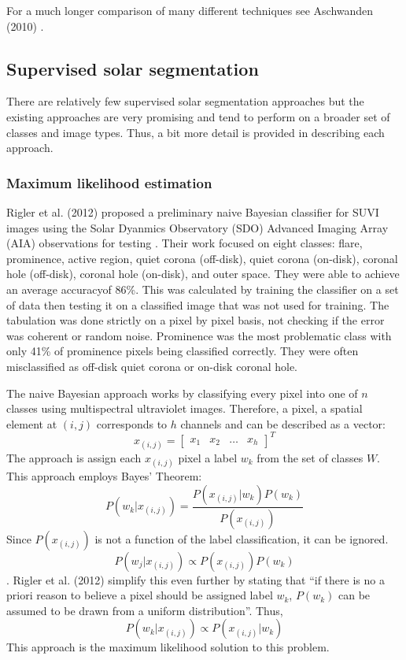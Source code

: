 \documentclass[twoside]{report}
\begin{document}
For a much longer comparison of many different techniques see Aschwanden (2010) \cite{aschwanden:2010}. 

\subsection{Supervised solar segmentation} \label{sec:supervised}
There are relatively few supervised solar segmentation approaches but the existing approaches are very promising and tend to perform on a broader set of classes and image types. Thus, a bit more detail is provided in describing each approach. 

\subsubsection{Maximum likelihood estimation}\label{sec:riglermaxlikelihood}

Rigler et al. (2012) proposed a preliminary naive Bayesian classifier for SUVI images using the Solar Dyanmics Observatory (SDO) Advanced Imaging Array (AIA) observations for testing \cite{rigler:2012}. Their work focused on eight classes: flare, prominence, active region, quiet corona (off-disk), quiet corona (on-disk), coronal hole (off-disk), coronal hole (on-disk), and outer space. They were able to achieve an average accuracyof 86\%. This was calculated by training the classifier on a set of data then testing it on a classified image that was not used for training. The tabulation was done strictly on a pixel by pixel basis, not checking if the error was coherent or random noise. Prominence was the most problematic class with only 41\% of prominence pixels being classified correctly. They were often misclassified as off-disk quiet corona or on-disk coronal hole.

The naive Bayesian approach works by classifying every pixel into one of $n$ classes using multispectral ultraviolet images. Therefore, a pixel, a spatial element at $(i,j)$ corresponds to $h$ channels and can be described as a vector:
\[ x_{(i,j)} = \begin{bmatrix} x_1 & x_2 & \hdots & x_h \end{bmatrix}^T \]
The approach is assign each $x_{(i,j)}$ pixel a label $w_k$ from the set of classes $W$. This approach employs Bayes' Theorem:
\[ P(w_k | x_{(i,j)}) = \frac{P(x_{(i,j)} | w_k) P(w_k)}{P(x_{(i,j)})} \]
Since $P(x_{(i,j)})$ is not a function of the label classification, it can be ignored.
\[ P(w_j | x_{(i,j)}) \propto P(x_{(i,j)}) P(w_{k}) \].
Rigler et al. (2012) simplify this even further by stating that ``if there is no a priori reason to believe a pixel should be assigned label $w_k$, $P(w_k)$ can be assumed to be drawn from a uniform distribution''. Thus,
\[ P(w_k | x_{(i,j)}) \propto P(x_{(i,j)} | w_k) \]
This approach is the maximum likelihood solution to this problem.
\end{document}
